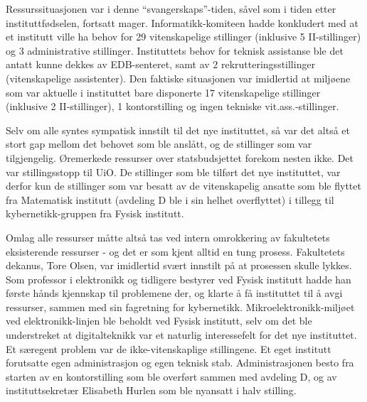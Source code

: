 \documentclass[../../main.tex]{subfiles}
\begin{document}
Ressurssituasjonen var i denne ``svangerskaps''-tiden, såvel som i tiden etter instituttfødselen, fortsatt mager. Informatikk-komiteen hadde konkludert med at et institutt ville ha behov for 29 vitenskapelige stillinger (inklusive 5 II-stillinger) og 3 administrative stillinger. Instituttets behov for teknisk assistanse ble det antatt kunne dekkes av EDB-senteret, samt av 2 rekrutteringsstillinger (vitenskapelige assistenter). Den faktiske situasjonen var imidlertid at miljøene som var aktuelle i instituttet bare disponerte 17 vitenskapelige stillinger (inklusive 2 II-stillinger), 1 kontorstilling og ingen tekniske vit.ass.-stillinger. 

Selv om alle syntes sympatisk innstilt til det nye instituttet, så var det altså et stort gap mellom det behovet som ble anslått, og de stillinger som var tilgjengelig. Øremerkede ressurser over statsbudsjettet forekom nesten ikke. Det var stillingsstopp til UiO. De stillinger som ble tilført det nye instituttet, var derfor kun de stillinger som var besatt av de vitenskapelig ansatte som ble flyttet fra Matematisk institutt (avdeling D ble i sin helhet
overflyttet) i tillegg til kybernetikk-gruppen fra Fysisk institutt.

Omlag alle ressurser måtte altså tas ved intern omrokkering av fakultetets eksisterende ressurser - og det er som kjent alltid en tung prosess. Fakultetets dekanus, Tore Olsen, var imidlertid svært innstilt på at prosessen skulle lykkes. Som professor i elektronikk og tidligere bestyrer ved Fysisk institutt hadde han første hånds kjennskap til problemene der, og klarte å få instituttet til å avgi ressurser, sammen med sin fagretning for kybernetikk. Mikroelektronikk-miljøet ved elektronikk-linjen ble beholdt ved Fysisk institutt, selv om det ble understreket at digitalteknikk var et naturlig interessefelt for det nye instituttet. Et særegent problem var de ikke-vitenskaplige stillingene. Et eget institutt forutsatte egen administrasjon og egen teknisk stab. Administrasjonen besto fra starten av en kontorstilling som ble overført sammen med avdeling D, og av instituttsekretær Elisabeth Hurlen som ble nyansatt i halv stilling.
\end{document}
